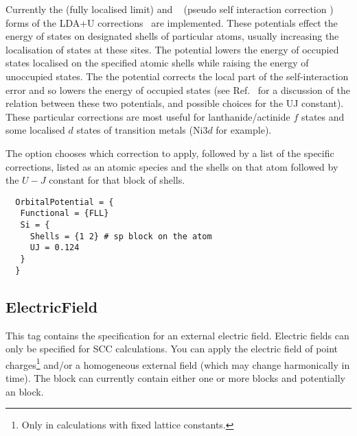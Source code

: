 Currently the  (fully localised limit) and
~\cite{hourahine07} (pseudo self interaction correction )
forms of the LDA+U corrections~\cite{petukhov-PRB-67-153106} are
implemented. These potentials effect the energy of states on
designated shells of particular atoms, usually increasing the
localisation of states at these sites. The  potential lowers
the energy of occupied states localised on the specified atomic shells
while raising the energy of unoccupied states. The the 
potential corrects the local part of the self-interaction error and so
lowers the energy of occupied states (see Ref.~\cite{hourahine07} for
a discussion of the relation between these two potentials, and
possible choices for the UJ constant).  These particular corrections
are most useful for lanthanide/actinide $f$ states and some localised
$d$ states of transition metals (Ni$3d$ for example).

The  option chooses which correction to apply, followed
by a list of the specific corrections, listed as an atomic species and
the shells on that atom followed by the $U-J$ constant for that block
of shells.

\begin{verbatim}
  OrbitalPotential = {
   Functional = {FLL}
   Si = {
     Shells = {1 2} # sp block on the atom
     UJ = 0.124
   }
  }
\end{verbatim}

\subsection{ElectricField}
\label{sec:dftbp.ElectricField}

This tag contains the specification for an external electric
field. Electric fields can only be specified for SCC calculations. You
can apply the electric field of point charges\footnote{Only in
  calculations with fixed lattice constants.} and/or a homogeneous
external field (which may change harmonically in time). The
 block can currently contain either one or more
 blocks and potentially an  block.

